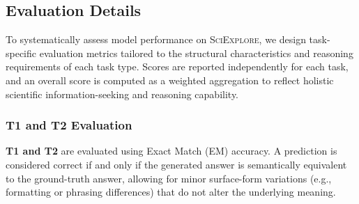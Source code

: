 
\subsection{Evaluation Details }
\label{app:evaluation_details}


To systematically assess model performance on \textsc{SciExplore}, we design task-specific evaluation metrics tailored to the structural characteristics and reasoning requirements of each task type.
Scores are reported independently for each task, and an overall score is computed as a weighted aggregation to reflect holistic scientific information-seeking and reasoning capability.

\subsubsection{T1 and T2 Evaluation}

\noindent \textbf{T1 and T2} are evaluated using Exact Match (EM) accuracy.
A prediction is considered correct if and only if the generated answer is semantically equivalent to the ground-truth answer, allowing for minor surface-form variations (e.g., formatting or phrasing differences) that do not alter the underlying meaning.

